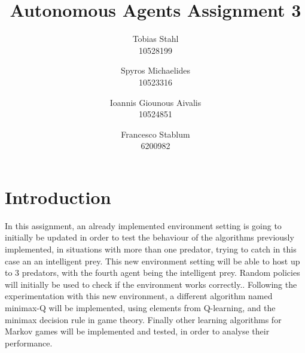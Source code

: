 \documentclass[a4paper,10pt]{article}
\title{
	\textbf{Autonomous Agents Assignment 3}
}
\author{Tobias Stahl \\ 10528199 \and Spyros Michaelides \\ 10523316 \and Ioannis Giounous Aivalis \\ 10524851 \and Francesco Stablum \\ 6200982}
\begin{document}
\maketitle


\section{Introduction}
In this assignment, an already implemented environment setting is going to initially be updated in order to test the behaviour of the algorithms previously implemented, in situations with more than one predator, trying to catch in this case an an intelligent prey. This new environment setting will be able to host up to 3 predators, with the fourth agent being the intelligent prey. Random policies will initially be used to check if the environment works correctly..
Following the experimentation with this new environment, a different algorithm named minimax-Q will be implemented, using elements from Q-learning, and the minimax decision rule in game theory.
Finally other learning algorithms for Markov games will be implemented and tested, in order to analyse their performance.










\end{document}
